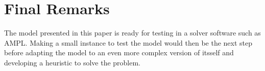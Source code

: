\documentclass[a4paper,10pt]{article}
\begin{document}
\section{Final Remarks}
The model presented in this paper is ready for testing in a solver software such as AMPL. Making a small instance to test the model would then be the next step before adapting the model to an even more complex version of itsself and developing a heuristic to solve the problem. 




\end{document}
